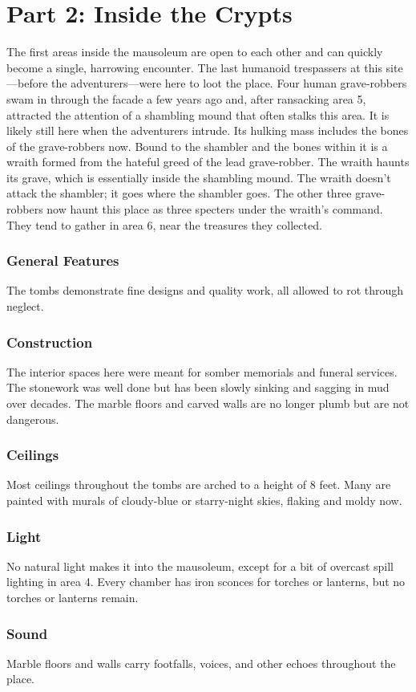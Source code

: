 \documentclass[10pt,a4paper,twoside,twocolumn,openany,bg=print,nodeprecatedcode]{dndbook}
\begin{document}
\chapter{Part 2: Inside the Crypts}
The first areas inside the mausoleum are open to each other and can quickly become a single, harrowing encounter.
The last humanoid trespassers at this site—before the adventurers—were here to loot the place. Four human grave-robbers swam in through the facade a few years ago and, after ransacking area 5, attracted the attention of a shambling mound that often stalks this area. It is likely still here when the adventurers intrude. Its hulking mass includes the bones of the grave-robbers now.
Bound to the shambler and the bones within it is a wraith formed from the hateful greed of the lead grave-robber. The wraith haunts its grave, which is essentially inside the shambling mound. The wraith doesn't attack the shambler; it goes where the shambler goes.
The other three grave-robbers now haunt this place as three specters under the wraith's command. They tend to gather in area 6, near the treasures they collected.
\subsection{General Features}
The tombs demonstrate fine designs and quality work, all allowed to rot through neglect.
\subsection{Construction}
The interior spaces here were meant for somber memorials and funeral services. The stonework was well done but has been slowly sinking and sagging in mud over decades. The marble floors and carved walls are no longer plumb but are not dangerous.
\subsection{Ceilings}
Most ceilings throughout the tombs are arched to a height of 8 feet. Many are painted with murals of cloudy-blue or starry-night skies, flaking and moldy now.
\subsection{Light}
No natural light makes it into the mausoleum, except for a bit of overcast spill lighting in area 4. Every chamber has iron sconces for torches or lanterns, but no torches or lanterns remain.
\subsection{Sound}
Marble floors and walls carry footfalls, voices, and other echoes throughout the place.
\end{document}
